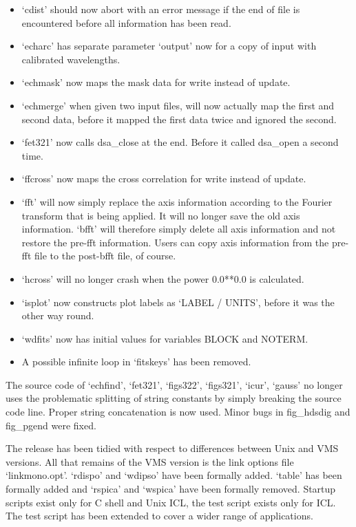 \begin{itemize}
\item `cdist' should now abort with an error message if the end of file is
      encountered before all information has been read.
\item `echarc' has separate parameter `output' now for a copy of input with
      calibrated wavelengths.
\item `echmask' now maps the mask data for write instead of update.
\item `echmerge' when given two input files, will now actually map the first
      and second data, before it mapped the first data twice and ignored the
      second.
\item `fet321' now calls dsa\_close at the end.  Before it called dsa\_open a
      second time.
\item `ffcross' now maps the cross correlation for write instead of update.
\item `fft' will now simply replace the axis information according to the
      Fourier transform that is being applied.  It will no longer save the
      old axis information.  `bfft' will therefore simply delete all axis
      information and not restore the pre-fft information.  Users can copy
      axis information from the pre-fft file to the post-bfft file, of
      course.
\item `hcross' will no longer crash when the power 0.0**0.0 is calculated.
\item `isplot' now constructs plot labels as `LABEL / UNITS', before it was
      the other way round.
\item `wdfits' now has initial values for variables BLOCK and NOTERM.
\item A possible infinite loop in `fitskeys' has been removed.
\end{itemize}

   The source code of `echfind', `fet321', `figs322', `figs321',
   `icur', `gauss' no longer uses the problematic splitting of string
   constants by simply breaking the source code line.  Proper string
   concatenation is now used. Minor bugs in fig\_hdsdig and fig\_pgend
   were fixed.

   The release has been tidied with respect to differences between Unix and
   VMS versions.  All that remains of the VMS version is the link options
   file `linkmono.opt'.  `rdispo' and `wdipso' have been formally
   added.  `table' has been formally added and `rspica' and `wspica'
   have been formally removed. Startup scripts exist only for C shell
   and Unix ICL, the test script exists only for ICL.  The test script
   has been extended to cover a wider range of applications.


